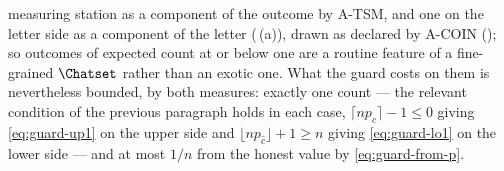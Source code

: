 \begin{remark}
measuring station as a component of the outcome by A-TSM, and one on the
letter side as a component of the letter
(\,(a)), drawn as declared by A-COIN
(); so outcomes of
expected count at or below one are a routine feature of a fine-grained
$\Chatset$ rather than an exotic one. What the guard costs on them is
nevertheless bounded, by both measures: exactly one count --- the relevant
condition of the previous paragraph holds in each case,
$\lceil np_{\hat c}\rceil-1\le0$ giving \eqref{eq:guard-up1} on the upper
side and $\lfloor np_{\hat c}\rfloor+1\ge n$ giving \eqref{eq:guard-lo1} on
the lower side --- and at most $1/n$ from the honest value by
\eqref{eq:guard-from-p}.
\end{remark}
